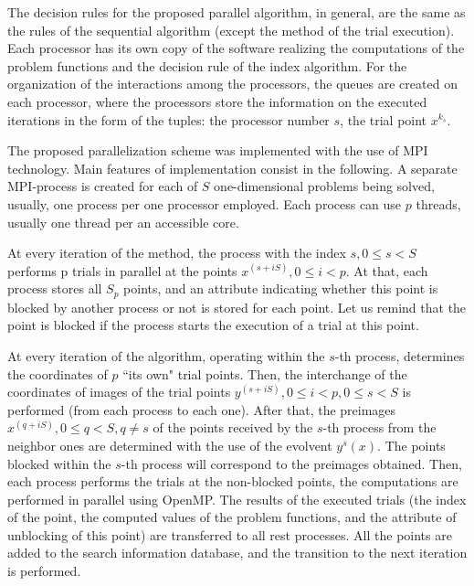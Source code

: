 \documentclass[runningheads]{llncs}
\begin{document}
The decision rules for the proposed parallel algorithm, in general, are the same as the rules of the
sequential algorithm (except the method of the trial execution). Each processor has its own copy
of the software realizing the computations of the problem functions and the decision rule of the
index algorithm. For the organization of the interactions among the processors, the queues are
created on each processor, where the processors store the information on the executed iterations
in the form of the tuples: the processor number \(s\), the trial point \(x{}^{k_s}\).
\par
The proposed parallelization scheme was implemented with the use of MPI technology. Main
features of implementation consist in the following. A separate MPI-process is created for each
of \(S\) one-dimensional problems being solved, usually, one process per one processor
employed. Each process can use $p$ threads, usually one thread per an accessible core.
\par
At every iteration of the method, the process with the index \(s,0\leqslant s< S\) performs p
trials in parallel at the points \(x^{(s+iS)},0\leqslant i<p\). At that, each process stores all
\(S_p\) points, and an attribute indicating whether this point is blocked by another process or
not is stored for each point. Let us remind that the point is blocked if the process starts the
execution of a trial at this point.
\par
At every iteration of the algorithm, operating within the \(s\)-th process, determines the
coordinates of \(p\) ``its own" trial points. Then, the interchange of the coordinates of images of
the trial points \(y^{(s+iS)},0\leqslant i<p, 0\leqslant s< S\) is performed (from each process to
each one). After that, the preimages \(x^{(q+iS)},0\leqslant q<S,q\not=s\) of the points
received by the \(s\)-th process from the neighbor ones are determined with the use of the
evolvent \(y^s (x)\). The points blocked within the \(s\)-th process will correspond to the
preimages obtained. Then, each process performs the trials at the non-blocked points, the
computations are performed in parallel using OpenMP. The results of the executed trials (the
index of the point, the computed values of the problem functions, and the attribute of
unblocking of this point) are transferred to all rest processes. All the points are added to the
search information database, and the transition to the next iteration is performed.

\end{document}
